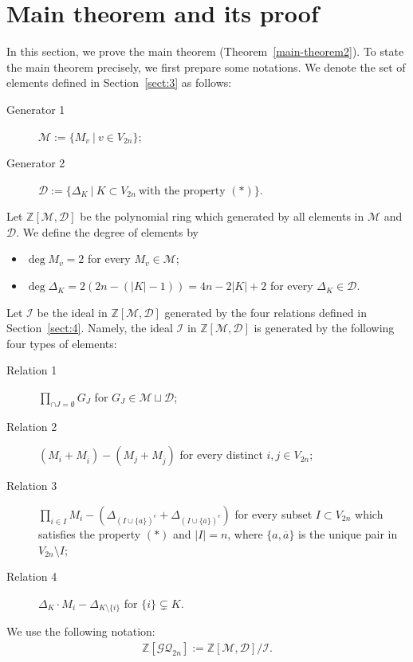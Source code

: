 \documentclass[12pt]{amsart}
\theoremstyle{remark}
\numberwithin{equation}{section}
\begin{document}
\section{Main theorem and its proof}
\label{sect:5}
In this section, we prove the main theorem (Theorem~\ref{main-theorem2}). 
To state the main theorem precisely, we first prepare some notations.
We denote the set of elements defined in Section~\ref{sect:3} as follows:
\begin{description}
\item[Generator 1] $\mathcal{M}:=\{M_{v}\ |\ v\in V_{2n}\}$;
\item[Generator 2] $\mathcal{D}:=\{\Delta_{K}\ |\ K\subset V_{2n}\ \text{with the property $(\ast)$}\}$.
\end{description}
Let $\mathbb{Z}[\mathcal{M}, \mathcal{D}]$ be the polynomial ring which generated by all elements in $\mathcal{M}$ and $\mathcal{D}$. 
We define the degree of elements by  
\begin{itemize}
\item $\deg M_{v}=2$ for every $M_{v}\in \mathcal{M}$; 
\item $\deg \Delta_{K}=2(2n-(|K|-1))=4n-2|K|+2$ for every $\Delta_{K}\in \mathcal{D}$.
\end{itemize}
Let $\mathcal{I}$ be the ideal in $\mathbb{Z}[\mathcal{M}, \mathcal{D}]$ generated by the four relations defined in Section~\ref{sect:4}.
Namely, 
the ideal $\mathcal{I}$ in $\mathbb{Z}[\mathcal{M}, \mathcal{D}]$ is generated by 
the following four types of elements:
\begin{description}
\item[Relation 1] $\prod_{\cap J=\emptyset}G_{J}$ for $G_{J}\in \mathcal{M}\sqcup \mathcal{D}$;
\item[Relation 2] $(M_{i}+M_{\overline{i}})-(M_{j}+M_{\overline{j}})$ for every distinct $i,j\in V_{2n}$;
\item[Relation 3] $\prod_{i\in I}M_{i}-(\Delta_{(I\cup \{a\})^{c}}+\Delta_{(I\cup \{\overline{a}\})^{c}})$ for every subset $I\subset V_{2n}$ which satisfies the property $(\ast)$ and $|I|=n$, where 
$\{a,\overline{a}\}$ is the unique pair in $V_{2n}\setminus I$;
\item[Relation 4] $\Delta_{K}\cdot M_{i}-\Delta_{K\setminus \{i\}}$ for $\{i\}\subsetneq K$.  
\end{description}
We use the following notation: %
\begin{align}
\label{Face-ring}
\mathbb{Z}[\mathcal{GQ}_{2n}]:=\mathbb{Z}[\mathcal{M},\mathcal{D}]/\mathcal{I}.
\end{align}
\end{document}
